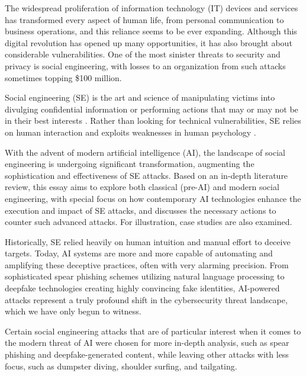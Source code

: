 The widespread proliferation of information technology (IT) devices and services has transformed every aspect of human life, from personal communication to business operations, and this reliance seems to be ever expanding. Although this digital revolution has opened up many opportunities, it has also brought about considerable vulnerabilities. One of the most sinister threats to security and privacy is social engineering, with losses to an organization from such attacks sometimes topping \$100 million.

Social engineering (SE) is the art and science of manipulating victims into divulging confidential information or performing actions that may or may not be in their best interests \citep{hadnagySocialEngineering2018}. Rather than looking for technical vulnerabilities, SE relies on human interaction and exploits weaknesses in human psychology \citep{wangDefiningSocialEngineering2020}.

With the advent of modern artificial intelligence (AI), the landscape of social engineering is undergoing significant transformation, augmenting the sophistication and effectiveness of SE attacks. Based on an in-depth literature review, this essay aims to explore both classical (pre-AI) and modern social engineering, with special focus on how contemporary AI technologies enhance the execution and impact of SE attacks, and discusses the necessary actions to counter such advanced attacks. For illustration, case studies are also examined.

Historically, SE relied heavily on human intuition and manual effort to deceive targets. Today, AI systems are more and more capable of automating and amplifying these deceptive practices, often with very alarming precision. From sophisticated spear phishing schemes utilizing natural language processing to deepfake technologies creating highly convincing fake identities, AI-powered attacks represent a truly profound shift in the cybersecurity threat landscape, which we have only begun to witness.


Certain social engineering attacks that are of particular interest when it comes to the modern threat of AI were chosen for more in-depth analysis, such as spear phishing and deepfake-generated content, while leaving other attacks with less focus, such as dumpster diving, shoulder surfing, and tailgating.

